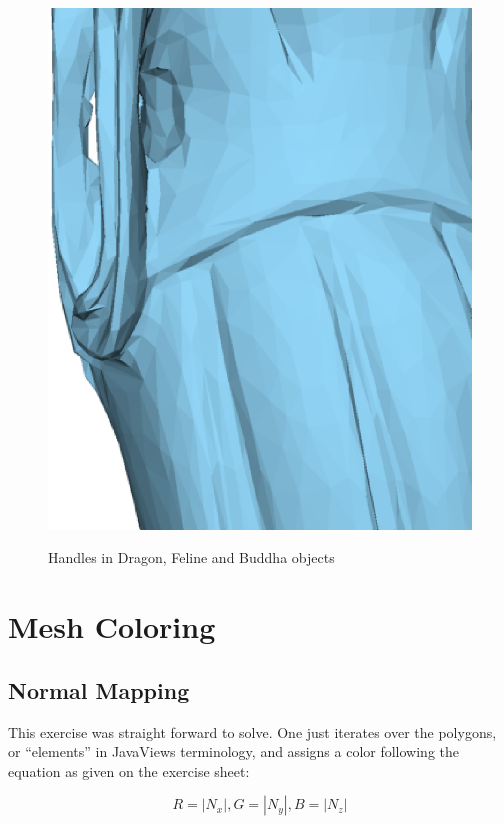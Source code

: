 \documentclass[a4paper,10pt,notitlepage]{scrreprt}
\begin{document}
\begin{figure}
{    \includegraphics[scale=0.4]{budda2.eps}}

  \caption{Handles in Dragon, Feline and Buddha objects}
\end{figure}

\chapter{Mesh Coloring}

\section{Normal Mapping}

This exercise was straight forward to solve. One just iterates over the
polygons, or ``elements'' in JavaViews terminology, and assigns a color
following the equation as given on the exercise sheet:

\begin{equation}
  R = |N_x|, G = |N_y|, B = |N_z|
 \label{eq:normal-mapping}
\end{equation}
\end{document}
